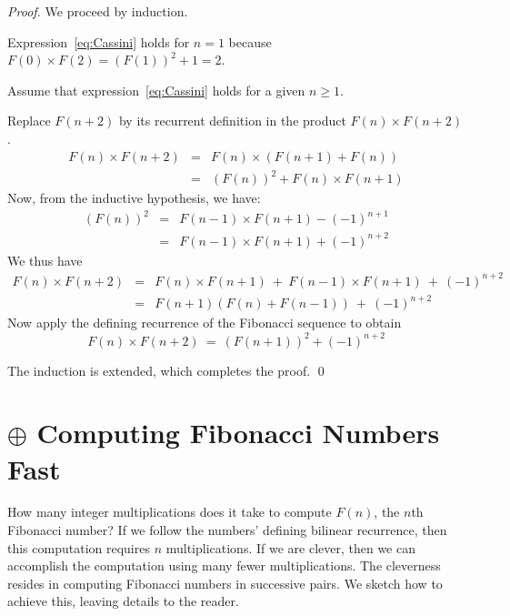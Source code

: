 \begin{proof}
We proceed by induction.

\smallskip

Expression~\ref{eq:Cassini} holds for $n=1$ because $F(0) \times F(2) = (F(1))^2 +1 = 2$.

\medskip

Assume that expression~\ref{eq:Cassini} holds for a given $n \geq 1$.

\medskip

Replace $F(n+2)$ by its recurrent definition in the product $F(n) \times F(n+2)$.
\begin{eqnarray*}
F(n) \times F(n+2) & = & F(n) \times (F(n+1)+F(n)) \\
                              & = & (F(n))^2 + F(n) \times F(n+1)
\end{eqnarray*}                   
Now, from the inductive hypothesis, we have:
\begin{eqnarray*}
(F(n))^2 & = & F(n-1) \times F(n+1) - (-1)^{n+1} \\
              & = & F(n-1) \times F(n+1) + (-1)^{n+2}
\end{eqnarray*}
We thus have
\begin{eqnarray*}
F(n) \times F(n+2) & = & F(n) \times F(n+1) \ + \ F(n-1) \times F(n+1) \ + \ (-1)^{n+2} \\
                              & = & F(n+1) (F(n) + F(n-1)) \ + \ (-1)^{n+2}
\end{eqnarray*}
Now apply the defining recurrence of the Fibonacci sequence to obtain
\[ F(n) \times F(n+2) \ = \ (F(n+1))^2 + (-1)^{n+2} \]

\smallskip

\noindent
The induction is extended, which completes the proof.  \qed
\end{proof}


\section{$\oplus$ Computing Fibonacci Numbers Fast}
\label{sec:FastFibo}

How many integer multiplications does it take to compute $F(n)$, the $n$th Fibonacci number?  If we follow the numbers' defining bilinear recurrence, then this computation requires $n$ multiplications.  If we are clever, then we can accomplish the computation using many fewer multiplications.  The cleverness resides in computing Fibonacci numbers in successive pairs.  We sketch how to achieve this, leaving details to the reader.

